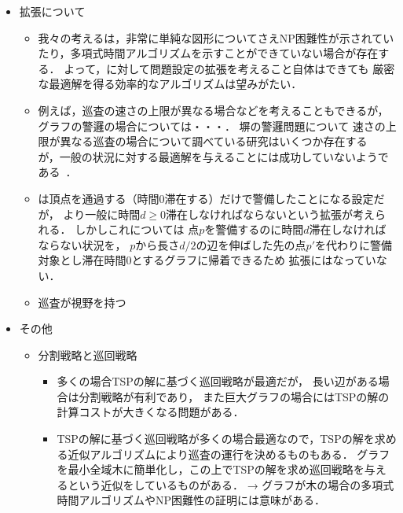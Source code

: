 \begin{itemize}
  \item 拡張について
  \begin{itemize}
    \item
      我々の考える{\patProb}は，非常に単純な図形についてさえNP困難性が示されていたり，多項式時間アルゴリズムを示すことができていない場合が存在する．
      よって，{\patProb}に対して問題設定の拡張を考えること自体はできても
      厳密な最適解を得る効率的なアルゴリズムは望みがたい．
    \item 例えば，巡査の速さの上限が異なる場合などを考えることもできるが，
      グラフの警邏の場合については・・・．
      塀の警邏問題について
      速さの上限が異なる巡査の場合について調べている研究はいくつか存在する~\cite{}
      が，一般の状況に対する最適解を与えることには成功していないようである~\cite{}．
    \item {\patProb}は頂点を通過する（時間$0$滞在する）だけで警備したことになる設定だが，
      より一般に時間$d \geq 0$滞在しなければならないという拡張が考えられる．
      しかしこれについては
      点$p$を警備するのに時間$d$滞在しなければならない状況を，
      $p$から長さ$d/2$の辺を伸ばした先の点$p'$を代わりに警備対象とし滞在時間$0$とするグラフに帰着できるため
      拡張にはなっていない．
    \item 巡査が視野を持つ

  \end{itemize}

  \item その他
  \begin{itemize}
    \item 分割戦略と巡回戦略
    \begin{itemize}
      \item 多くの場合TSPの解に基づく巡回戦略が最適だが，
        長い辺がある場合は分割戦略が有利であり，
        また巨大グラフの場合にはTSPの解の計算コストが大きくなる問題がある．
      \item TSPの解に基づく巡回戦略が多くの場合最適なので，TSPの解を求める近似アルゴリズムにより巡査の運行を決めるものもある．
      グラフを最小全域木に簡単化し，この上でTSPの解を求め巡回戦略を与えるという近似をしているものがある．
      → グラフが木の場合の多項式時間アルゴリズムやNP困難性の証明には意味がある．
    \end{itemize} 
  \end{itemize}
\end{itemize}



